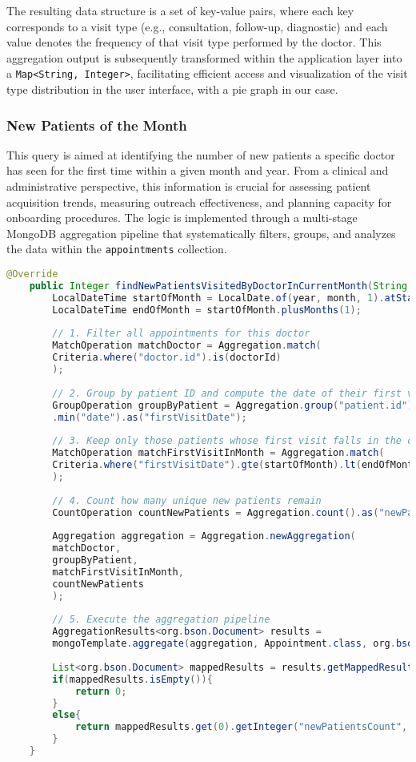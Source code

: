 The resulting data structure is a set of key-value pairs, where each key corresponds to a visit type (e.g., consultation, follow-up, diagnostic) and each value denotes the frequency of that visit type performed by the doctor. This aggregation output is subsequently transformed within the application layer into a \texttt{Map<String, Integer>}, facilitating efficient access and visualization of the visit type distribution in the user interface, with a pie graph in our case.

\subsubsection{New Patients of the Month}
This query is aimed at identifying the number of new patients a specific doctor has seen for the first time within a given month and year. From a clinical and administrative perspective, this information is crucial for assessing patient acquisition trends, measuring outreach effectiveness, and planning capacity for onboarding procedures. The logic is implemented through a multi-stage MongoDB aggregation pipeline that systematically filters, groups, and analyzes the data within the \texttt{appointments} collection.

\begin{lstlisting}[language=java]
	@Override
	public Integer findNewPatientsVisitedByDoctorInCurrentMonth(String doctorId, Integer year, Integer month){
		LocalDateTime startOfMonth = LocalDate.of(year, month, 1).atStartOfDay();
		LocalDateTime endOfMonth = startOfMonth.plusMonths(1);
		
		// 1. Filter all appointments for this doctor
		MatchOperation matchDoctor = Aggregation.match(
		Criteria.where("doctor.id").is(doctorId)
		);
		
		// 2. Group by patient ID and compute the date of their first visit
		GroupOperation groupByPatient = Aggregation.group("patient.id")
		.min("date").as("firstVisitDate");
		
		// 3. Keep only those patients whose first visit falls in the current month
		MatchOperation matchFirstVisitInMonth = Aggregation.match(
		Criteria.where("firstVisitDate").gte(startOfMonth).lt(endOfMonth)
		);
		
		// 4. Count how many unique new patients remain
		CountOperation countNewPatients = Aggregation.count().as("newPatientsCount");
		
		Aggregation aggregation = Aggregation.newAggregation(
		matchDoctor,
		groupByPatient,
		matchFirstVisitInMonth,
		countNewPatients
		);
		
		// 5. Execute the aggregation pipeline
		AggregationResults<org.bson.Document> results =
		mongoTemplate.aggregate(aggregation, Appointment.class, org.bson.Document.class);
		
		List<org.bson.Document> mappedResults = results.getMappedResults();
		if(mappedResults.isEmpty()){
			return 0;
		}
		else{
			return mappedResults.get(0).getInteger("newPatientsCount", 0);
		}
	}
\end{lstlisting}

